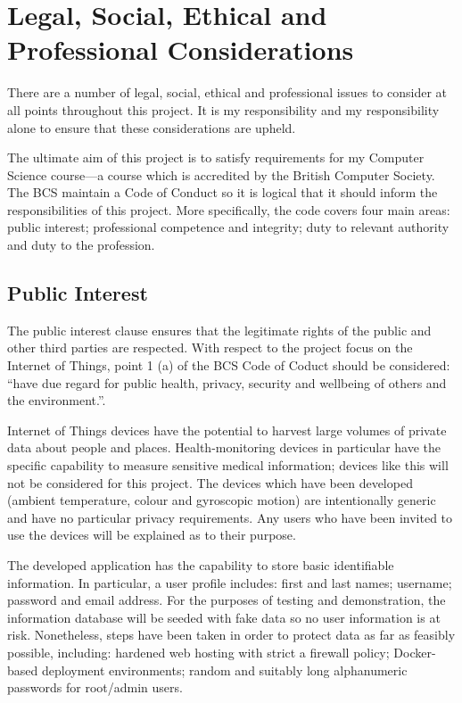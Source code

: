 \chapter{Legal, Social, Ethical and Professional Considerations}
\label{chapter:profession-considerations}
  There are a number of legal, social, ethical and professional issues to consider at all points throughout this project. It is my responsibility and my responsibility alone to ensure that these considerations are upheld.

  The ultimate aim of this project is to satisfy requirements for my Computer Science course---a course which is accredited by the British Computer Society. The BCS maintain a Code of Conduct \citep{bcs-coc} so it is logical that it should inform the responsibilities of this project. More specifically, the code covers four main areas: public interest; professional competence and integrity; duty to relevant authority and duty to the profession.

  \section{Public Interest}
    The public interest clause ensures that the legitimate rights of the public and other third parties are respected. With respect to the project focus on the Internet of Things, point 1 (a) of the BCS Code of Coduct should be considered: ``have due regard for public health, privacy, security and wellbeing of others and the environment.''.

    Internet of Things devices have the potential to harvest large volumes of private data about people and places. Health-monitoring devices in particular have the specific capability to measure sensitive medical information; devices like this will not be considered for this project. The devices which have been developed (ambient temperature, colour and gyroscopic motion) are intentionally generic and have no particular privacy requirements. Any users who have been invited to use the devices will be explained as to their purpose.

    The developed application has the capability to store basic identifiable information. In particular, a user profile includes: first and last names; username; password and email address. For the purposes of testing and demonstration, the information database will be seeded with fake data so no user information is at risk. Nonetheless, steps have been taken in order to protect data as far as feasibly possible, including: hardened web hosting with strict a firewall policy; Docker-based deployment environments; random and suitably long alphanumeric passwords for root/admin users.

